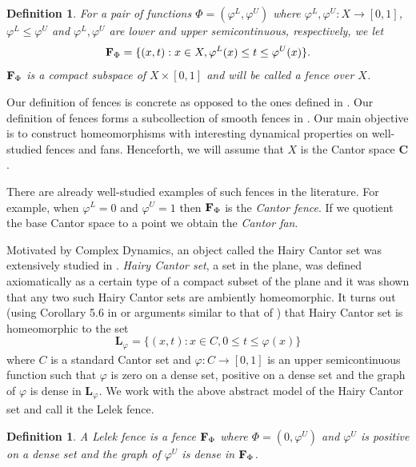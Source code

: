 \documentclass[11pt]{amsart}
\newtheorem{definition}[theorem]{Definition}
\newcommand{\cantor}{\mathbf C}
\newcommand{\fence}{{\bf F}_{\Phi}{}}
\newcommand{\ffence}[2]{{\mathbf L}_{{#1}_{#2}}}
\begin{document}
\begin{definition}
For a pair of functions  $\Phi=(\varphi^L,\varphi^U)$ where $\varphi^L,\varphi^U: X \rightarrow [0,1]$, $\varphi^{L}\leq \varphi^U$ and $\varphi^{L}, \varphi^U$ are lower  and upper semicontinuous, respectively,   we let
\[ \fence = \{(x,t): x \in X, \varphi^L(x) \le t \le \varphi^U(x) \}. \] 
 ${\bf F}_{\Phi}$ is a compact subspace of $X \times [0,1]$ and will be called a \emph{fence over $X$}.
\end{definition}

 Our definition of fences is concrete as opposed to the ones defined in \cite{BassoCamerlo}. Our  definition of fences forms a subcollection of smooth fences in \cite{BassoCamerlo}. Our main objective is to construct homeomorphisms with interesting dynamical properties on well-studied fences and fans. Henceforth, we will assume that $X$ is the Cantor space $\cantor$.

There are already well-studied examples of such fences in the literature. For example, when $\varphi^L=0$ and $\varphi^U=1$ then $\fence$ is the \emph{Cantor fence}. If we quotient the base Cantor space to a point we obtain the \emph{Cantor fan}.


Motivated by Complex Dynamics, an object called the Hairy Cantor set was extensively studied in \cite{haircantorset}. 
\emph{Hairy Cantor set}, a set in the plane, was defined axiomatically \cite{haircantorset} as a certain type of a compact subset of the plane and it was shown that any two such Hairy Cantor sets are ambiently homeomorphic. 
It turns out (using  Corollary 5.6 in \cite{haircantorset} or arguments similar to that of \cite{oversteegenOneLF}) that Hairy Cantor set is homeomorphic to the set
\[ \ffence{\varphi}{} = \{(x,t): x \in C, 0 \le t \le \varphi(x) \} \]
where $C$ is a standard Cantor set and $\varphi: C \rightarrow [0,1]$ is an upper semicontinuous function such that $\varphi$ is zero on a dense set, positive on a dense set and the graph of $\varphi$ is dense in $\ffence{\varphi}{}$. 
We work with the above   abstract model of the Hairy Cantor set and call it the Lelek fence.

\begin{definition}
A \emph{Lelek fence} is a fence $\fence$ where $\Phi=(0,\varphi^U)$ and $\varphi^U$ is positive on a dense set and the graph of $\varphi^U$ is dense in $\fence$. 
\end{definition}
\end{document}
